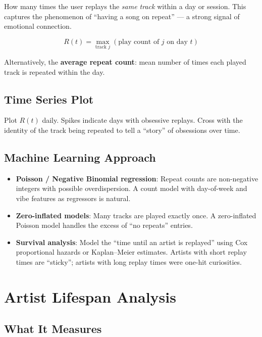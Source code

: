 \documentclass[12pt, a4paper]{article}
\begin{document}
How many times the user replays the \emph{same track} within a day or
session. This captures the phenomenon of ``having a song on repeat'' ---
a strong signal of emotional connection.

\[
    R(t) = \max_{\text{track } j}\left(\text{play count of } j
           \text{ on day } t\right)
\]

Alternatively, the \textbf{average repeat count}: mean number of times each
played track is repeated within the day.

\subsection{Time Series Plot}

Plot $R(t)$ daily. Spikes indicate days with obsessive replays. Cross with
the identity of the track being repeated to tell a ``story'' of obsessions
over time.

\subsection{Machine Learning Approach}

\begin{itemize}
    \item \textbf{Poisson / Negative Binomial regression}: Repeat counts
          are non-negative integers with possible overdispersion. A count
          model with day-of-week and vibe features as regressors is natural.
    \item \textbf{Zero-inflated models}: Many tracks are played exactly once.
          A zero-inflated Poisson model handles the excess of ``no repeats''
          entries.
    \item \textbf{Survival analysis}: Model the ``time until an artist is
          replayed'' using Cox proportional hazards or Kaplan--Meier
          estimates. Artists with short replay times are ``sticky'';
          artists with long replay times were one-hit curiosities.
\end{itemize}

\section{Artist Lifespan Analysis}

\subsection{What It Measures}
\end{document}
